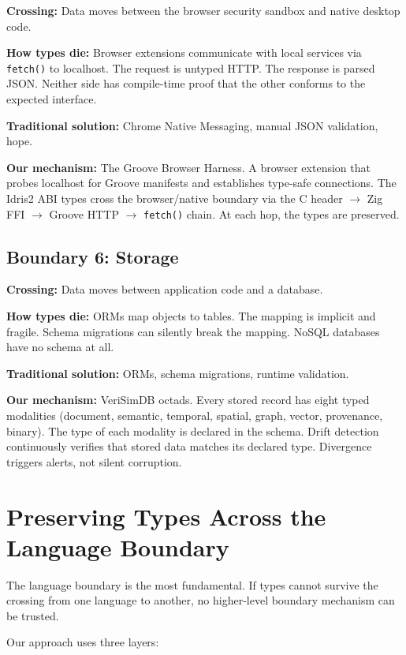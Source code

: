 \documentclass[11pt,a4paper]{article}
\begin{document}
\textbf{Crossing:} Data moves between the browser security sandbox
and native desktop code.

\textbf{How types die:} Browser extensions communicate with local
services via \texttt{fetch()} to localhost. The request is untyped
HTTP. The response is parsed JSON. Neither side has compile-time proof
that the other conforms to the expected interface.

\textbf{Traditional solution:} Chrome Native Messaging, manual JSON
validation, hope.

\textbf{Our mechanism:} The Groove Browser Harness. A browser extension
that probes localhost for Groove manifests and establishes type-safe
connections. The Idris2 ABI types cross the browser/native boundary via
the C header $\rightarrow$ Zig FFI $\rightarrow$ Groove HTTP
$\rightarrow$ \texttt{fetch()} chain. At each hop, the types are
preserved.

\subsection{Boundary 6: Storage}

\textbf{Crossing:} Data moves between application code and a database.

\textbf{How types die:} ORMs map objects to tables. The mapping is
implicit and fragile. Schema migrations can silently break the mapping.
NoSQL databases have no schema at all.

\textbf{Traditional solution:} ORMs, schema migrations, runtime
validation.

\textbf{Our mechanism:} VeriSimDB octads. Every stored record has eight
typed modalities (document, semantic, temporal, spatial, graph, vector,
provenance, binary). The type of each modality is declared in the
schema. Drift detection continuously verifies that stored data matches
its declared type. Divergence triggers alerts, not silent corruption.

\section{Preserving Types Across the Language Boundary}
\label{sec:language}

The language boundary is the most fundamental. If types cannot survive
the crossing from one language to another, no higher-level boundary
mechanism can be trusted.

Our approach uses three layers:
\end{document}
